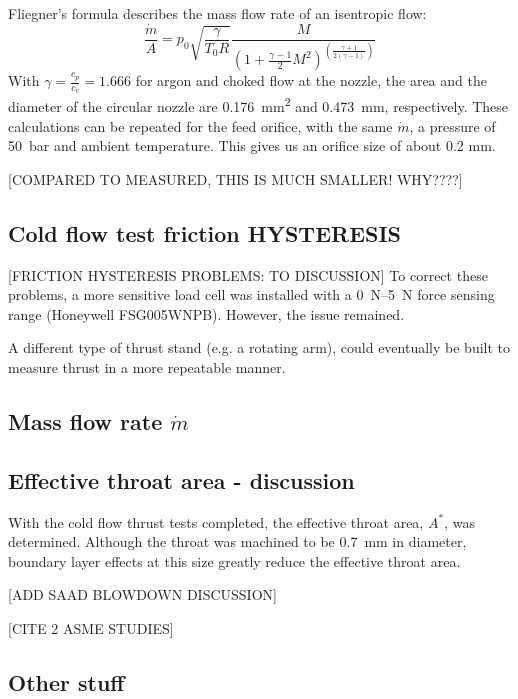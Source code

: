             Fliegner's formula describes the mass flow rate of an isentropic flow:
            \[\frac{\dot m}{A} = p_0\sqrt{\frac{\gamma}{T_0 R}}\frac{M}{(1+\frac{\gamma-1}{2}M^2)^{(\frac{\gamma+1}{2(\gamma-1)})}}\]
            With $\gamma = \frac{c_p}{c_v} = 1.666$ for argon and choked flow at the nozzle, the area and the diameter of the circular nozzle are \qty{0.176}{mm^2} and \qty{0.473}{mm}, respectively. These calculations can be repeated for the feed orifice, with the same $\dot m$, a pressure of \qty{50}{bar} and ambient temperature. This gives us an orifice size of about 0.2 mm.

            [COMPARED TO MEASURED, THIS IS MUCH SMALLER! WHY????]
    
    \subsection{Cold flow test friction HYSTERESIS}

        [FRICTION HYSTERESIS PROBLEMS: TO DISCUSSION] To correct these problems, a more sensitive load cell was installed with a \qtyrange{0}{5}{N} force sensing range (Honeywell FSG005WNPB). However, the issue remained.

        A different type of thrust stand (e.g. a rotating arm), could eventually be built to measure thrust in a more repeatable manner.

    \subsection{Mass flow rate $\dot m$}


    \subsection{Effective throat area - discussion}
            
        With the cold flow thrust tests completed, the effective throat area, $A^*$, was determined. Although the throat was machined to be \qty{0.7}{mm} in diameter, boundary layer effects at this size greatly reduce the effective throat area.

        [ADD SAAD BLOWDOWN DISCUSSION]

        [CITE 2 ASME STUDIES]

    \subsection*{Other stuff}

